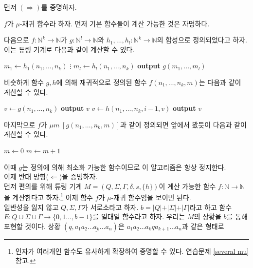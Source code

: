 \documentclass[b5paper, 11pt]{book}
\theoremstyle{definition}
\newenvironment{pf*}{\pushQED{\qed}\pf}
{\popQED\endpf}
\begin{document}
\begin{pf*}
    먼저 $(\Rightarrow)$를 증명하자. 

    $f$가 $\mu$-재귀 함수라 하자. 먼저 기본 함수들이 계산 가능한 것은 자명하다. 

    다음으로 $f:\mathbb{N}^k \rightarrow \mathbb{N}$가  $g: \mathbb{N}^l \rightarrow \mathbb{N}$와 $h_1, \ldots, h_l:\mathbb{N}^k \rightarrow \mathbb{N}$의 합성으로 정의되었다고 하자. 이는 튜링 기계로 다음과 같이 계산할 수 있다.
    \begin{algorithmic}
        \State $m_1 \gets h_1(n_1, \ldots, n_k)$
        \State $\vdots$
        \State $m_l \gets h_l(n_1, \ldots, n_k)$
        \State \textbf{output} $g(m_1, \ldots, m_l)$
    \end{algorithmic}
    비슷하게 함수 $g, h$에 의해 재귀적으로 정의된 함수 $f(n_1, \ldots, n_k, m)$는 다음과 같이 계산할 수 있다.
    \begin{algorithmic}
        \State $v \gets g(n_1, \ldots, n_k)$
        \State \textbf{output} $v$
        \Else
        \State $v \gets h(n_1, \ldots, n_k, i-1, v)$
        \EndFor
        \State \textbf{output} $v$
        \EndIf
    \end{algorithmic}
    마지막으로 $f$가 $\mu m \; [g(n_1, \ldots, n_k, m)]$과 같이 정의되면 앞에서 봤듯이 다음과 같이 계산할 수 있다.
    \begin{algorithmic}
        \State $m \gets 0$
            \State $m \gets m+1$
        \EndWhile
    \end{algorithmic}
    이때 $g$는 정의에 의해 최소화 가능한 함수이므로 이 알고리즘은 항상 정지한다.\\
    이제 반대 방향($\Leftarrow$)을 증명하자.\\
    먼저 편의를 위해 튜링 기계 $M = (Q, \Sigma, \Gamma, \delta, s, \{h\})$이 계산 가능한 함수 $f: \mathbb{N} \rightarrow \mathbb{N}$을 계산한다고 하자.\footnote{인자가 여러개인 함수도 유사하게 확장하여 증명할 수 있다. 연습문제 \ref{several mu} 참고.} 이제 함수 $f$가 $\mu$-재귀 함수임을 보이면 된다. \\
    일반성을 잃지 않고 $Q, \Sigma, \Gamma$가 서로소라고 하자. $b = \vert Q \vert + \vert \Sigma \vert 
    + \vert \Gamma \vert$라고 하고 함수 $E:Q \cup \Sigma \cup \Gamma \rightarrow \{0, 1 
    \ldots, b-1\}$를 일대일 함수라고 하자. 우리는 $M$의 상황을 $b$를 통해 표현할 것이다. 상황 $(q,
    a_1a_2 \ldots \underline{a_k} \ldots a_n)$은 $a_1a_2\ldots a_k q a_{k+1} \ldots a_n$과 같은 형태로 

\end{pf*}
\end{document}

